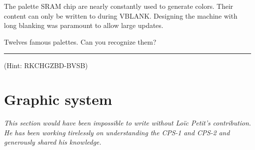  The palette SRAM chip are nearly constantly used to generate colors. Their content can only be written to during VBLANK. Designing the machine with long blanking was paramount to allow large updates. 



 




\pagebreak




Twelves famous palettes. Can you recognize them?









\par\noindent\rule{\textwidth}{0.4pt}





 (Hint: RKCHGZBD-BVSB)














\section{Graphic system}

\emph{This section would have been impossible to write without Lo\"{i}c Petit's contribution. He has been working tirelessly on understanding the CPS-1 and CPS-2 and generously shared his knowledge.}

